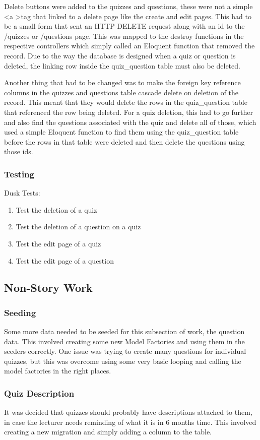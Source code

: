 Delete buttons were added to the quizzes and questions, these were not a simple \textless a \textgreater tag that linked to a delete page like the create and edit pages. This had to be a small form that sent an HTTP DELETE request along with an id to the /quizzes or /questions page. This was mapped to the destroy functions in the respective controllers which simply called an Eloquent function that removed the record. Due to the way the database is designed when a quiz or question is deleted, the linking row inside the quiz\_question table must also be deleted. 

Another thing that had to be changed was to make the foreign key reference columns in the quizzes and questions table cascade delete on deletion of the record. This meant that they would delete the rows in the quiz\_question table that referenced the row being deleted. For a quiz deletion, this had to go further and also find the questions associated with the quiz and delete all of those, which used a simple Eloquent function to find them using the quiz\_question table before the rows in that table were deleted and then delete the questions using those ids. 
\subsubsection{Testing}
Dusk Tests:
\begin{enumerate}
	\item Test the deletion of a quiz
	\item Test the deletion of a question on a quiz
	\item Test the edit page of a quiz
	\item Test the edit page of a question
\end{enumerate}
\newpage

\subsection{Non-Story Work}
\subsubsection{Seeding}
Some more data needed to be seeded for this subsection of work, the question data. This involved creating some new Model Factories and using them in the seeders correctly. One issue was trying to create many questions for individual quizzes, but this was overcome using some very basic looping and calling the model factories in the right places.
\subsubsection{Quiz Description}
It was decided that quizzes should probably have descriptions attached to them, in case the lecturer needs reminding of what it is in 6 months time. This involved creating a new migration and simply adding a column to the table.
